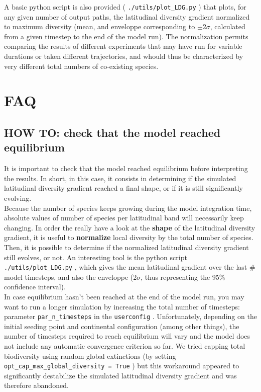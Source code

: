 \documentclass[a4paper, 11pt]{article}
\newcommand\code[1]{%
\texttt{#1}%
}
\begin{document}
A basic python script is also provided (\code{./utils/plot\_LDG.py}) that plots, for any given number of output paths, the latitudinal diversity gradient normalized to maximum diversity (mean, and enveloppe corresponding to $\pm$2$\sigma$, calculated from a given timestep to the end of the model run). The normalization permits comparing the results of different experiments that may have run for variable durations or taken different trajectories, and whould thus be characterized by very different total numbers of co-existing species.

\section{FAQ}

    \subsection{HOW TO: check that the model reached equilibrium}

It is important to check that the model reached equilibrium before interpreting the results. In short, in this case, it consists in determining if the simulated latitudinal diversity gradient reached a final shape, or if it is still significantly evolving.\\

Because the number of species keeps growing during the model integration time, absolute values of number of species per latitudinal band will necessarily keep changing. In order the really have a look at the \textbf{shape} of the latitudinal diversity gradient, it is useful to \textbf{normalize} local diversity by the total number of species. Then, it is possible to determine if the normalized latitudinal diversity gradient still evolves, or not. An interesting tool is the python script \code{./utils/plot\_LDG.py}, which gives the mean latitudinal gradient over the last \# model timesteps, and also the enveloppe (2$\sigma$, thus representing the 95\% confidence interval).\\

In case equilibrium hasn't been reached at the end of the model run, you may want to run a longer simulation by increasing the total number of timesteps: parameter \code{par\_n\_timesteps} in the \code{userconfig}. Unfortunately, depending on the initial seeding point and continental configuration (among other things), the number of timesteps required to reach equilibrium will vary and the model does not include any automatic convergence criterion so far. We tried capping total biodiversity using random global extinctions (by setting \code{opt\_cap\_max\_global\_diversity = True}) but this workaround appeared to significantly destabilize the simulated latitudinal diversity gradient and was therefore abandoned.
\end{document}

